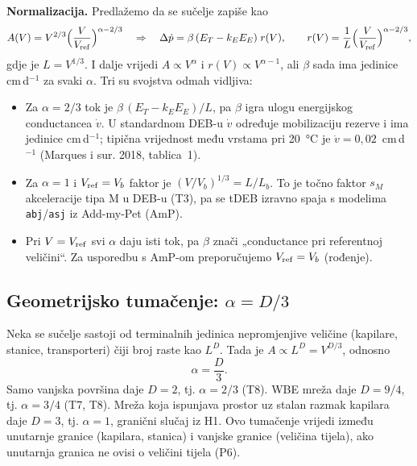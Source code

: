 \textbf{Normalizacija.} Predlažemo da se sučelje zapiše kao
\begin{equation}\label{eq:norm}
A(V)=V^{2/3}\Big(\frac{V}{V_{\mathrm{ref}}}\Big)^{\alpha-2/3}
\quad\Rightarrow\quad
\Delta\dot{p}=\beta\,(E_T-k_E E_E)\;r(V),\qquad r(V)=\frac{1}{L}\Big(\frac{V}{V_{\mathrm{ref}}}\Big)^{\alpha-2/3},
\end{equation}
gdje je $L=V^{1/3}$. I dalje vrijedi $A\propto V^{\alpha}$ i $r(V)\propto V^{\alpha-1}$, ali $\beta$ sada ima jedinice cm\,d$^{-1}$ za svaki $\alpha$. Tri su svojstva odmah vidljiva:
\begin{itemize}
\item Za $\alpha=2/3$ tok je $\beta\,(E_T-k_E E_E)/L$, pa $\beta$ igra ulogu energijskog conductancea $\dot v$. U standardnom DEB-u $\dot v$ određuje mobilizaciju rezerve i ima jedinice cm\,d$^{-1}$; tipična vrijednost među vrstama pri 20~°C je $\dot v=0{,}02$~cm\,d$^{-1}$ (Marques i sur. 2018, tablica~1).
\item Za $\alpha=1$ i $V_{\mathrm{ref}}=V_b$ faktor je $(V/V_b)^{1/3}=L/L_b$. To je točno faktor $s_M$ akceleracije tipa M u DEB-u (T3), pa se tDEB izravno spaja s modelima \texttt{abj}/\texttt{asj} iz Add-my-Pet (AmP).
\item Pri $V=V_{\mathrm{ref}}$ svi $\alpha$ daju isti tok, pa $\beta$ znači „conductance pri referentnoj veličini“. Za usporedbu s AmP-om preporučujemo $V_{\mathrm{ref}}=V_b$ (rođenje).
\end{itemize}

\subsection{Geometrijsko tumačenje: $\alpha=D/3$}

Neka se sučelje sastoji od terminalnih jedinica nepromjenjive veličine (kapilare, stanice, transporteri) čiji broj raste kao $L^{D}$. Tada je $A\propto L^{D}=V^{D/3}$, odnosno
\begin{equation}\label{eq:D3}
\alpha=\frac{D}{3}.
\end{equation}
Samo vanjska površina daje $D=2$, tj. $\alpha=2/3$ (T8). WBE mreža daje $D=9/4$, tj. $\alpha=3/4$ (T7, T8). Mreža koja ispunjava prostor uz stalan razmak kapilara daje $D=3$, tj. $\alpha=1$, granični slučaj iz H1. Ovo tumačenje vrijedi između unutarnje granice (kapilara, stanica) i vanjske granice (veličina tijela), ako unutarnja granica ne ovisi o veličini tijela (P6).
